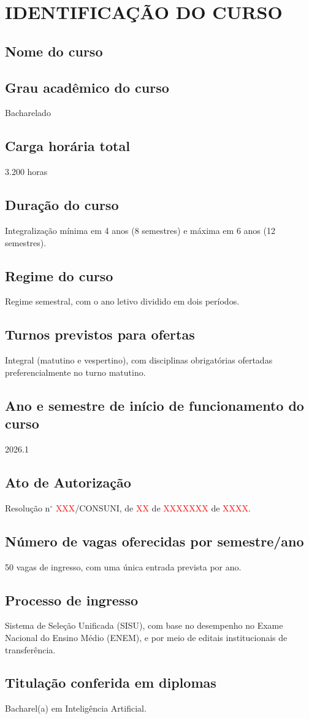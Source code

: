 \chapter{IDENTIFICAÇÃO DO CURSO}
\label{cap:identificacao-do-curso}

\section*{Nome do curso}
\nomedocurso

\section*{Grau acadêmico do curso}
Bacharelado

\section*{Carga horária total}
3.200 horas

\section*{Duração do curso}
Integralização mínima em 4 anos (8 semestres) e máxima em 6 anos (12 semestres).

\section*{Regime do curso}
Regime semestral, com o ano letivo dividido em dois períodos.

\section*{Turnos previstos para ofertas}
Integral (matutino e vespertino), com disciplinas obrigatórias ofertadas	preferencialmente no turno matutino.

\section*{Ano e semestre de início de funcionamento do curso}
2026.1

\section*{Ato de Autorização}
Resolução n$^\circ$ \textcolor{red}{XXX}/CONSUNI, de \textcolor{red}{XX} de \textcolor{red}{XXXXXXX} de \textcolor{red}{XXXX}.


\section*{Número de vagas oferecidas por semestre/ano}
50 vagas de ingresso, com uma única entrada prevista por ano.

\section*{Processo de ingresso}
Sistema de Seleção Unificada (SISU), com base no desempenho no Exame Nacional do Ensino Médio (ENEM), e por meio de editais institucionais de transferência.

\section*{Titulação conferida em diplomas}
Bacharel(a) em Inteligência Artificial.

